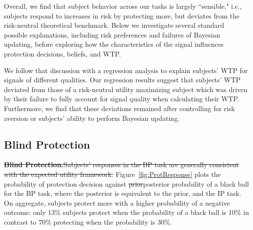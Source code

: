 \documentclass[12pt,a4paper]{article}
\newcommand{\pmst}[1]{{\color{Blue}\sout{#1}}}
\begin{document}

Overall, we find that subject behavior across our tasks is largely ``sensible," i.e., subjects respond to increases in risk by protecting more, but deviates from the risk-neutral theoretical benchmark.  Below we investigate several standard possible explanations, including risk preferences and failures of Bayesian updating, before exploring how the characteristics of the signal influences protection decisions, beliefs, and WTP.

We follow that discussion with a regression analysis to explain subjects’ WTP for signals of different qualities. Our regression results suggest that subjects’ WTP deviated from those of a risk-neutral utility maximizing subject which was driven by their failure to fully account for signal quality when calculating their WTP. Furthermore, we find that these deviations remained after controlling for risk aversion or subjects’ ability to perform Bayesian updating. 




\subsection{Blind Protection}



\pmst{\textbf{Blind Protection.}}\pmst{Subjects’ responses in the BP task are generally consistent with the expected utility framework.} Figure~\ref{fig:ProtResponse} plots the probability of protection decision against \pmst{prior}posterior probability of a black ball for the BP task, where the posterior is equivalent to the prior, and the IP task. On aggregate, subjects protect more with a higher probability of a negative outcome: only 13\% subjects protect when the probability of a black ball is 10\% in contrast to 70\% protecting when the probability is 30\%. 
\end{document}
